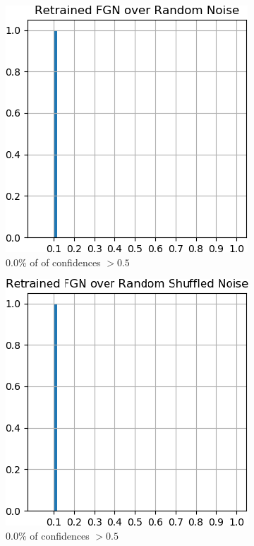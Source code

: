 \documentclass[12pt,oneside]{CUNY_PhD}
\begin{document}
\begin{figure}[!h]
    \centering
    \begin{subfigure}[t]{0.49\textwidth}
        \includegraphics[width=\textwidth]{images/mnist-behavior/retrained-hist-random.png}
        \caption*{0.0\% of of confidences $>0.5$}
    \end{subfigure}
    \begin{subfigure}[t]{0.49\textwidth}
        \includegraphics[width=\textwidth]{images/mnist-behavior/retrained-hist-shuffled.png}
        \caption*{0.0\% of confidences $>0.5$}
    \end{subfigure}
    \caption{}
    \label{fig:ret-hist}
\end{figure}
\newpage %
\end{document}
